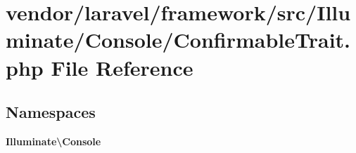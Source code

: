 \section{vendor/laravel/framework/src/\+Illuminate/\+Console/\+Confirmable\+Trait.php File Reference}
\label{_confirmable_trait_8php}
\subsection*{Namespaces}
\begin{DoxyCompactItemize}
\item 
 {\bf Illuminate\textbackslash{}\+Console}
\end{DoxyCompactItemize}
